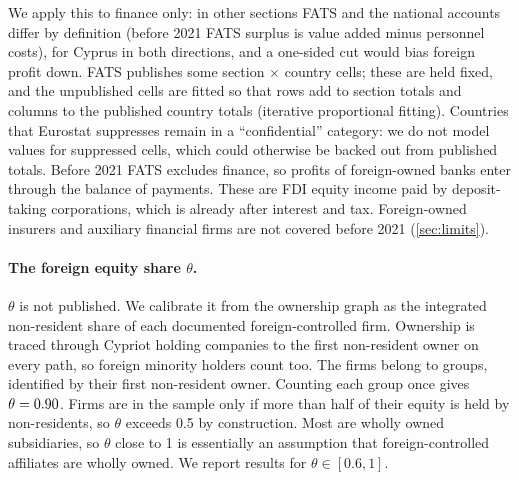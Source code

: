 \documentclass[11pt]{article}
\begin{document}
We apply this to finance only: in other sections FATS and the national accounts differ by definition (before 2021 FATS surplus is value added minus personnel costs), for Cyprus in both directions, and a one-sided cut would bias foreign profit down.
FATS publishes some section $\times$ country cells; these are held fixed, and the unpublished cells are fitted so that rows add to section totals and columns to the published country totals (iterative proportional fitting).
Countries that Eurostat suppresses remain in a ``confidential'' category: we do not model values for suppressed cells, which could otherwise be backed out from published totals.
Before 2021 FATS excludes finance, so profits of foreign-owned banks enter through the balance of payments.
These are FDI equity income paid by deposit-taking corporations, which is already after interest and tax.
Foreign-owned insurers and auxiliary financial firms are not covered before 2021 (\cref{sec:limits}).

\paragraph{The foreign equity share $\theta$.}
$\theta$ is not published.
We calibrate it from the ownership graph as the integrated non-resident share of each documented foreign-controlled firm.
Ownership is traced through Cypriot holding companies to the first non-resident owner on every path, so foreign minority holders count too.
The \ThetaN{} firms belong to \ThetaGroups{} groups, identified by their first non-resident owner.
Counting each group once gives $\theta=0.90$.
Firms are in the sample only if more than half of their equity is held by non-residents, so $\theta$ exceeds 0.5 by construction.
Most are wholly owned subsidiaries, so $\theta$ close to 1 is essentially an assumption that foreign-controlled affiliates are wholly owned.
We report results for $\theta\in[0.6,1]$.
\end{document}
